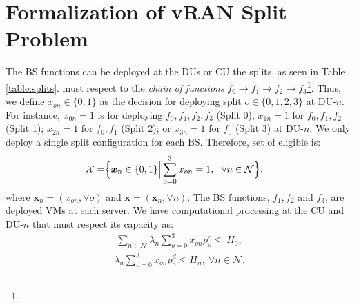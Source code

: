 \section{Formalization of vRAN Split Problem} \label{sec:problem}
\vspace{-1mm}
The BS functions can be deployed at the DUs or CU  the splits, as seen in Table \ref{table:splits}.  must respect to the \emph{chain of functions} $f_0 \!\rightarrow\! f_1 \!\rightarrow\! f_2 \!\rightarrow\! f_3$\footnote{}. Thus, we define $x_{on} \in \{0,1\}$ as the decision for deploying split $o \in \{0,1,2,3\}$ at DU-$n$. For instance, $x_{0n} = 1$ is for deploying $f_0, f_1, f_2, f_3$ (Split 0); $x_{1n} = 1$ for $f_0, f_1, f_2$ (Split 1); $x_{2n}= 1$ for $f_0, f_1$ (Split 2); or $x_{3n}= 1$ for $f_0$ (Split 3) at DU-$n$. 
%
%
We only deploy a single split configuration for each BS. Therefore,  set of eligible  is:
%
\begin{align} \label{eq:setx}
\mathcal{X} =  &\Bigl\{  \bm{x}_n  \in \{0,1\} \Big| \sum_{o=0}^3 x_{on}=1 , 
\ \ \forall n \in \mathcal{N}  \Bigr\} , 
\end{align}
%
where $\bm{x}_n = ( x_{on}, \forall o  )$ and $\bm{x} = (\bm{x}_n, \forall n)$. The BS functions,  $f_1, f_2$ and $f_3$, are deployed  VMs at each server. We have computational processing at the CU and DU-$n$ that must respect  its capacity as:
%
\begin{align} \label{eq:computing1}
\sum_{n \in \mathcal{N}} \lambda_{n} \sum_{o =0}^3    x_{on} \rho^{c}_o \leq \ H_0, 
%
\end{align}
%
%
\begin{align} \label{eq:computing2} \lambda_{n} \sum_{o =0}^3   x_{on} \rho^{d}_o \leq H_n, \ \forall n \in \mathcal{N}. 
%
\end{align}
%

